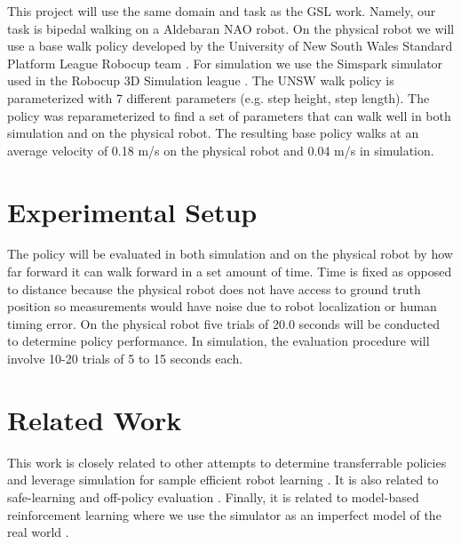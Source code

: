 \documentclass[12 pt]{article}
\begin{document}
This project will use the same domain and task as the GSL work. Namely, our task is bipedal walking on a Aldebaran NAO robot. On the physical robot we will use a base walk policy developed by the University of New South Wales Standard Platform League Robocup team \cite{ashar2014robocup}. For simulation we use the Simspark simulator used in the Robocup 3D Simulation league \cite{simspark}. The UNSW walk policy is parameterized with 7 different parameters (e.g. step height, step length). The policy was reparameterized to find a set of parameters that can walk well in both simulation and on the physical robot. The resulting base policy walks at an average velocity of 0.18 m/s on the physical robot and 0.04 m/s in simulation.

\section{Experimental Setup}

The policy will be evaluated in both simulation and on the physical robot by how far forward it can walk forward in a set amount of time. Time is fixed as opposed to distance because the physical robot does not have access to ground truth position so measurements would have noise due to robot localization or human timing error. On the physical robot five trials of 20.0 seconds will be conducted to determine policy performance. In simulation, the evaluation procedure will involve 10-20 trials of 5 to 15 seconds each. 

\section{Related Work}

This work is closely related to other attempts to determine transferrable policies and leverage simulation for sample efficient robot learning \cite{koos2010crossing} \cite{cutler2014reinforcement}. It is also related to safe-learning and off-policy evaluation \cite{thomas2015off-policy} \cite{silver2014deterministic}. Finally, it is related to model-based reinforcement learning where we use the simulator as an imperfect model of the real world \cite{kupcsik2013data} \cite{deisenroth2011pilco}.



\end{document}
